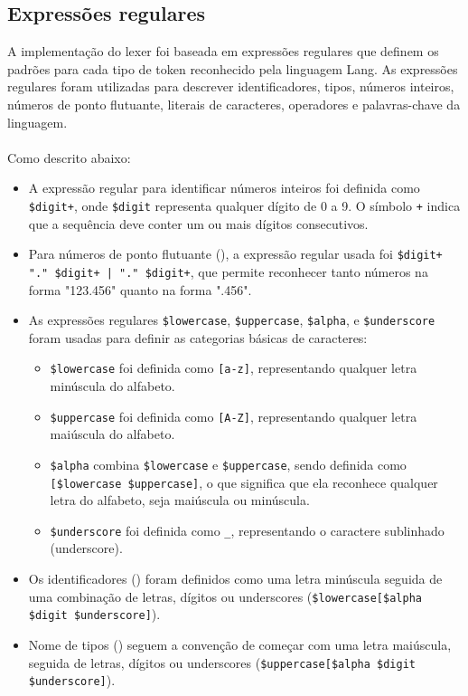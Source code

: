 \documentclass{article}
\begin{document}
\subsection{Expressões regulares}
A implementação do lexer foi baseada em expressões regulares que definem os padrões para cada tipo de token reconhecido pela linguagem Lang. As expressões regulares foram utilizadas para descrever identificadores, tipos, números inteiros, números de ponto flutuante, literais de caracteres, operadores e palavras-chave da linguagem.
\\\\
Como descrito abaixo:
\begin{itemize}
    \item A expressão regular para identificar números inteiros \texttt{\@integer} foi definida como \texttt{\$digit+}, onde \texttt{\$digit} representa qualquer dígito de 0 a 9. O símbolo \texttt{+} indica que a sequência deve conter um ou mais dígitos consecutivos.
    \item Para números de ponto flutuante (\texttt{\@float}), a expressão regular usada foi \texttt{\$digit+ "." \$digit+ | "." \$digit+}, que permite reconhecer tanto números na forma "123.456" quanto na forma ".456".
    \item As expressões regulares \texttt{\$lowercase}, \texttt{\$uppercase}, \texttt{\$alpha}, e \texttt{\$underscore} foram usadas para definir as categorias básicas de caracteres:
    \begin{itemize}
        \item \texttt{\$lowercase} foi definida como \texttt{[a-z]}, representando qualquer letra minúscula do alfabeto.
        \item \texttt{\$uppercase} foi definida como \texttt{[A-Z]}, representando qualquer letra maiúscula do alfabeto.
        \item \texttt{\$alpha} combina \texttt{\$lowercase} e \texttt{\$uppercase}, sendo definida como \texttt{[\$lowercase \$uppercase]}, o que significa que ela reconhece qualquer letra do alfabeto, seja maiúscula ou minúscula.
        \item \texttt{\$underscore} foi definida como \texttt{\_}, representando o caractere sublinhado (underscore).
    \end{itemize}
    \item Os identificadores (\texttt{\@identifier}) foram definidos como uma letra minúscula seguida de uma combinação de letras, dígitos ou underscores (\texttt{\$lowercase[\$alpha \$digit \$underscore]}).
    \item Nome de tipos (\texttt{\@typename}) seguem a convenção de começar com uma letra maiúscula, seguida de letras, dígitos ou underscores (\texttt{\$uppercase[\$alpha \$digit \$underscore]}).

\end{itemize}
\end{document}
